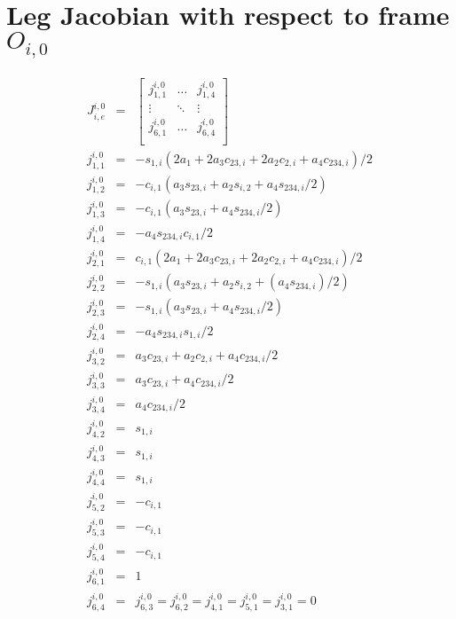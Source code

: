 \chapter{Leg Jacobian with respect to frame $O_{i,0}$}
\label{appendix::a}
	\begin{eqnarray*}
		J^{i,0}_{i,e} &=& 
		\left[
			\begin{array}{ccc}
				j_{1,1}^{i,0}	& \ldots 		& j_{1,4}^{i,0} 	\\
				\vdots 			& \ddots 		& \vdots 			\\
				j_{6,1}^{i,0}	& \ldots 	 	& j_{6,4}^{i,0} 	\\
			\end{array}
		\right]\\
		j_{1,1}^{i,0} &=& -s_{1,i} (2 a_{1} + 2 a_{3} c_{23,i} + 2 a_{2} c_{2,i} + a_{4} c_{234,i})/2\nonumber\\
		j_{1,2}^{i,0} &=& -c_{i,1} (a_{3} s_{23,i} + a_{2} s_{i,2} + a_{4} s_{234,i}/2)				\nonumber\\
		j_{1,3}^{i,0} &=& -c_{i,1} (a_{3} s_{23,i} + a_{4} s_{234,i}/2)								\nonumber\\
		j_{1,4}^{i,0} &=& -a_{4} s_{234,i} c_{i,1}/2 												\nonumber\\
		j_{2,1}^{i,0} &=& c_{i,1} (2 a_{1} + 2 a_{3} c_{23,i} + 2 a_{2} c_{2,i} + a_{4} c_{234,i})/2\nonumber\\
		j_{2,2}^{i,0} &=& -s_{1,i} (a_{3} s_{23,i} + a_{2} s_{i,2} + (a_{4} s_{234,i})/2)				\nonumber\\
		j_{2,3}^{i,0} &=& -s_{1,i} (a_{3} s_{23,i} + a_{4} s_{234,i}/2)								\nonumber\\
		j_{2,4}^{i,0} &=& -a_{4} s_{234,i} s_{1,i}/2 												\nonumber\\
		j_{3,2}^{i,0} &=& a_{3} c_{23,i} + a_{2} c_{2,i} + a_{4} c_{234,i}/2						\nonumber\\
		j_{3,3}^{i,0} &=& a_{3} c_{23,i} + a_{4} c_{234,i}/2										\nonumber\\
		j_{3,4}^{i,0} &=& a_{4} c_{234,i}/2 														\nonumber\\
		j_{4,2}^{i,0} &=& s_{1,i}																		\nonumber\\
		j_{4,3}^{i,0} &=& s_{1,i}																		\nonumber\\
		j_{4,4}^{i,0} &=& s_{1,i}																		\nonumber\\
		j_{5,2}^{i,0} &=& -c_{i,1}																	\nonumber\\
		j_{5,3}^{i,0} &=& -c_{i,1}																	\nonumber\\
		j_{5,4}^{i,0} &=& -c_{i,1}																	\nonumber\\
		j_{6,1}^{i,0} &=& 1																			\nonumber\\
		j_{6,4}^{i,0} &=& j_{6,3}^{i,0} = j_{6,2}^{i,0} = j_{4,1}^{i,0} = j_{5,1}^{i,0} = j_{3,1}^{i,0} = 0															\nonumber\\
		\label{eq::leg_jacobian}
	\end{eqnarray*}